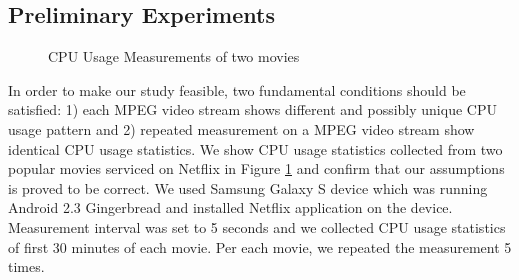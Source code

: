 \subsection{Preliminary Experiments}

\begin{figure}[!ht]
	\centering
	\caption{CPU Usage Measurements of two movies}
	\label{fig:preliminaries}
\end{figure}

In order to make our study feasible, two fundamental conditions should be satisfied: 1) each MPEG video stream shows different and possibly unique CPU usage pattern and 2) repeated measurement on a MPEG video stream show identical CPU usage statistics. 
We show CPU usage statistics collected from two popular movies serviced on Netflix in Figure \ref{fig:preliminaries} and confirm that our assumptions is proved to be correct.
We used Samsung Galaxy S device which was running Android 2.3 Gingerbread and installed Netflix application on the device. 
Measurement interval was set to 5 seconds and we collected CPU usage statistics of first 30 minutes of each movie. 
Per each movie, we repeated the measurement 5 times. 

